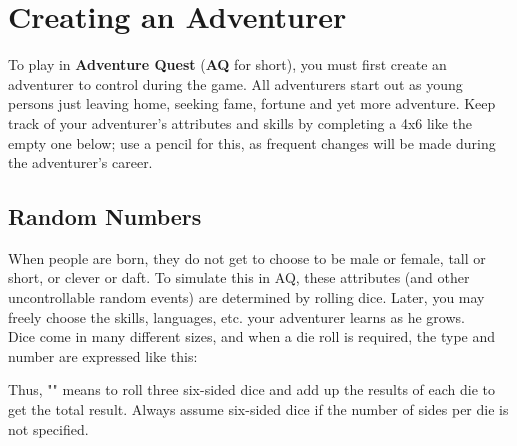 \chapter{Creating an Adventurer}
\label{ch:create-adventurer}
To play in \textbf{Adventure Quest} (\textbf{AQ} for short), you must first create an adventurer to control during the game. All adventurers start out as young persons just leaving home, seeking fame, fortune and yet more adventure. Keep track of your adventurer's attributes and skills by completing a 4x6  like the empty one below; use a pencil for this, as frequent changes will be made during the adventurer's career.


\setlength{\columnsep}{\defcolwidth}
\begin{multicols*}{2}
\section{Random Numbers}
When people are born, they do not get to choose to be male or female, tall or short, or clever or daft. To simulate this in AQ, these attributes (and other uncontrollable random events) are determined by rolling dice. Later, you may freely choose the skills, languages, etc. your adventurer learns as he grows.\\
Dice come in many different sizes, and when a die roll is required, the type and number are expressed like this:\\
\begin{center}
\end{center}
Thus, "" means to roll three six-sided dice and add up the results of each die to get the total result. Always assume six-sided dice if the number of sides per die is not specified.

\end{multicols*}
